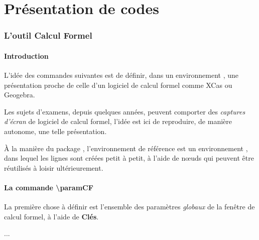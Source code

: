 \documentclass{article}
\newcommand\ctex[1]{\tcbox[vignettelatex]{#1}}
\newcommand\Cle[1]{{\bfseries\sffamily\textlangle #1\textrangle}}
\begin{document}
\newpage

\part{Présentation de codes}

\section{L'outil \og Calcul Formel \fg}

\subsection{Introduction}

\begin{codeidee}
L'idée des commandes suivantes est de définir, dans un environnement \TikZ, une présentation proche de celle d'un logiciel de calcul formel comme \textsf{XCas} ou \textsf{Geogebra}.

\smallskip

Les sujets d'examens, depuis quelques années, peuvent comporter des \textit{captures d'écran} de logiciel de calcul formel, l'idée est ici de reproduire, de manière autonome, une telle présentation.

\smallskip

À la manière du {package} \ctex{tkz-tab}, l'environnement de référence est un environnement \TikZ, dans lequel les lignes sont créées petit à petit, à l'aide de nœuds qui peuvent être réutilisés à loisir ultérieurement.
\end{codeidee}

\subsection{La commande \og \textbackslash{}paramCF \fg}

\begin{codeinfo}
La première chose à définir est l'ensemble des paramètres \textit{globaux} de la fenêtre de calcul formel, à l'aide de \Cle{Clés}.
\end{codeinfo}

\begin{codetex}
...
\end{codetex}
\end{document}
